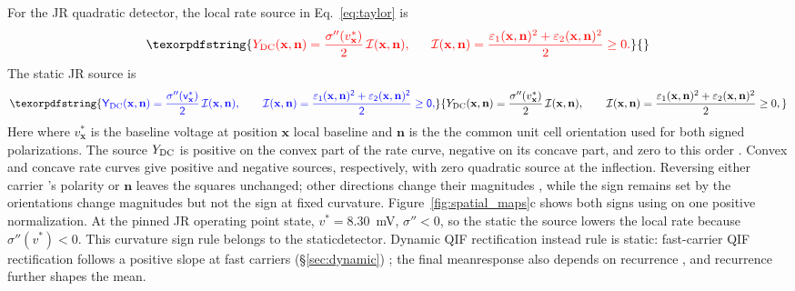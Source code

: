 \documentclass[11pt,a4paper]{article}
\newcommand{\Sig}{\sigma}
\providecommand{\DIFaddtex}[1]{{\protect\color{blue} \sf #1}} %
\providecommand{\DIFdeltex}[1]{{\protect\color{red} \scriptsize #1}} %
\providecommand{\DIFaddbegin}{} %
\providecommand{\DIFaddend}{} %
\providecommand{\DIFdelbegin}{} %
\providecommand{\DIFdelend}{} %
\providecommand{\DIFadd}[1]{\texorpdfstring{\DIFaddtex{#1}}{#1}} %
\providecommand{\DIFdel}[1]{\texorpdfstring{\DIFdeltex{#1}}{}} %
\begin{document}
\DIFdelbegin \DIFdel{For the JR quadratic detector, the local rate source in Eq.~\eqref{eq:taylor} is
}\[
\DIFdel{Y_{\rm DC}(\mathbf x,\mathbf n)
=\frac{\Sig''(v^*_{\mathbf x})}{2}\,\mathcal I(\mathbf x,\mathbf n),
\qquad
\mathcal I(\mathbf x,\mathbf n)
=\frac{\varepsilon_1(\mathbf x,\mathbf n)^2+
\varepsilon_2(\mathbf x,\mathbf n)^2}{2}\ge0.
}\]%
\DIFdelend \DIFaddbegin \DIFadd{The static JR source is
}\[
\DIFadd{Y_{\rm DC}(\mathbf x,\mathbf n)
=\frac{\Sig''(v^*_{\mathbf x})}{2}\,\mathcal I(\mathbf x,\mathbf n),
\qquad
\mathcal I(\mathbf x,\mathbf n)
=\frac{\varepsilon_1(\mathbf x,\mathbf n)^2+
\varepsilon_2(\mathbf x,\mathbf n)^2}{2}\ge0,
}\]\DIFaddend
\DIFdelbegin \DIFdel{Here }\DIFdelend \DIFaddbegin \DIFadd{where }\DIFaddend $v^*_{\mathbf x}$ is the \DIFdelbegin \DIFdel{baseline voltage at position $\mathbf x$ }\DIFdelend \DIFaddbegin \DIFadd{local baseline }\DIFaddend and $\mathbf n$ \DIFdelbegin \DIFdel{is the }\DIFdelend \DIFaddbegin \DIFadd{the common
}\DIFaddend unit cell orientation\DIFdelbegin \DIFdel{used for both signed polarizations. The source $Y_{\rm DC}$ is positive on the convex part of the rate curve,
negative on its concave part, and zero to this order }\DIFdelend \DIFaddbegin \DIFadd{. Convex and concave rate curves give positive and
negative sources, respectively, with zero quadratic source }\DIFaddend at the inflection.
Reversing either carrier \DIFdelbegin \DIFdel{'s polarity }\DIFdelend or $\mathbf n$ leaves the squares unchanged;
other \DIFdelbegin \DIFdel{directions change their magnitudes , while the sign remains set by the }\DIFdelend \DIFaddbegin \DIFadd{orientations change magnitudes but not the sign at }\DIFaddend fixed curvature.
Figure~\ref{fig:spatial_maps}c shows both signs \DIFdelbegin \DIFdel{using }\DIFdelend \DIFaddbegin \DIFadd{on }\DIFaddend one positive normalization.
At the pinned JR \DIFdelbegin \DIFdel{operating point }\DIFdelend \DIFaddbegin \DIFadd{state, }\DIFaddend $v^*=8.30$~mV, \DIFdelbegin \DIFdel{$\Sig''<0$, so the static
}\DIFdelend \DIFaddbegin \DIFadd{the }\DIFaddend source lowers the local rate
\DIFaddbegin \DIFadd{because $\Sig''(v^*)<0$}\DIFaddend .
This curvature \DIFdelbegin \DIFdel{sign rule belongs to the staticdetector. Dynamic QIF rectification instead }\DIFdelend \DIFaddbegin \DIFadd{rule is static: fast-carrier QIF rectification }\DIFaddend follows a
positive slope \DIFdelbegin \DIFdel{at fast carriers
}\DIFdelend (\S\ref{sec:dynamic})\DIFdelbegin \DIFdel{; the final meanresponse also depends on recurrence}\DIFdelend \DIFaddbegin \DIFadd{, and recurrence further shapes the mean}\DIFaddend .
\end{document}
